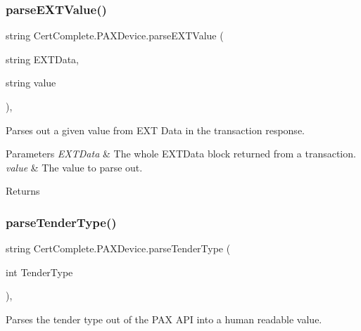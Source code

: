 \subsubsection{\texorpdfstring{parse\+E\+X\+T\+Value()}{parseEXTValue()}}
{\footnotesize\ttfamily string Cert\+Complete.\+P\+A\+X\+Device.\+parse\+E\+X\+T\+Value (\begin{DoxyParamCaption}\item[{string}]{E\+X\+T\+Data,  }\item[{string}]{value }\end{DoxyParamCaption})\hspace{0.3cm}{\ttfamily [inline]}, {\ttfamily [private]}}



Parses out a given value from E\+XT Data in the transaction response. 


\begin{DoxyParams}{Parameters}
{\em E\+X\+T\+Data} & The whole E\+X\+T\+Data block returned from a transaction.\\
\hline
{\em value} & The value to parse out.\\
\hline
\end{DoxyParams}
\begin{DoxyReturn}{Returns}

\end{DoxyReturn}
\mbox{\label{class_cert_complete_1_1_p_a_x_device_a1cd769ca0a4f2aeadaf1995355b2f0a9}} 
\subsubsection{\texorpdfstring{parse\+Tender\+Type()}{parseTenderType()}}
{\footnotesize\ttfamily string Cert\+Complete.\+P\+A\+X\+Device.\+parse\+Tender\+Type (\begin{DoxyParamCaption}\item[{int}]{Tender\+Type }\end{DoxyParamCaption})\hspace{0.3cm}{\ttfamily [inline]}, {\ttfamily [private]}}



Parses the tender type out of the P\+AX A\+PI into a human readable value. 


